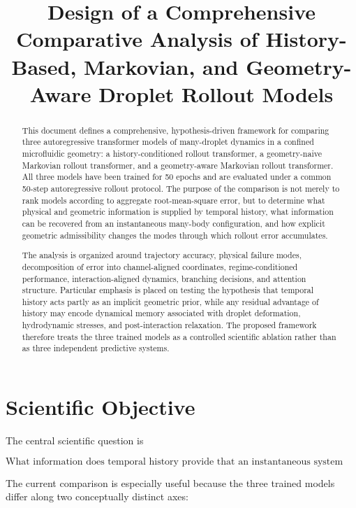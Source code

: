 \documentclass[11pt]{article}
\title{\textbf{Design of a Comprehensive Comparative Analysis of History-Based, Markovian, and Geometry-Aware Droplet Rollout Models}}
\author{}
\date{}
\begin{document}
\maketitle

\begin{abstract}
This document defines a comprehensive, hypothesis-driven framework for comparing three autoregressive transformer models of many-droplet dynamics in a confined microfluidic geometry: a history-conditioned rollout transformer, a geometry-naive Markovian rollout transformer, and a geometry-aware Markovian rollout transformer. All three models have been trained for 50 epochs and are evaluated under a common 50-step autoregressive rollout protocol. The purpose of the comparison is not merely to rank models according to aggregate root-mean-square error, but to determine what physical and geometric information is supplied by temporal history, what information can be recovered from an instantaneous many-body configuration, and how explicit geometric admissibility changes the modes through which rollout error accumulates.

The analysis is organized around trajectory accuracy, physical failure modes, decomposition of error into channel-aligned coordinates, regime-conditioned performance, interaction-aligned dynamics, branching decisions, and attention structure. Particular emphasis is placed on testing the hypothesis that temporal history acts partly as an implicit geometric prior, while any residual advantage of history may encode dynamical memory associated with droplet deformation, hydrodynamic stresses, and post-interaction relaxation. The proposed framework therefore treats the three trained models as a controlled scientific ablation rather than as three independent predictive systems.
\end{abstract}

\section{Scientific Objective}

The central scientific question is

\begin{equation}
\boxed{
\text{What information does temporal history provide that an instantaneous system state does not?}
}
\end{equation}

The current comparison is especially useful because the three trained models differ along two conceptually distinct axes:
\end{document}
